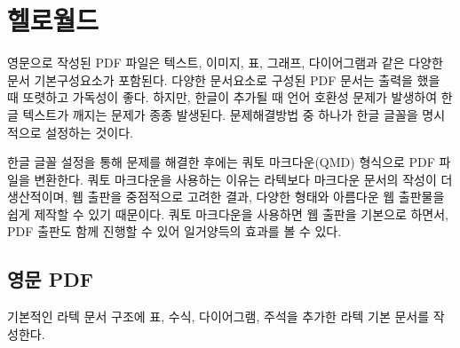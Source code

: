 \documentclass[
  letterpaper,
]{book}
\begin{document}
\hypertarget{uxd5ecuxb85cuxc6d4uxb4dc}{%
\section{헬로월드}\label{uxd5ecuxb85cuxc6d4uxb4dc}}

영문으로 작성된 PDF 파일은 텍스트, 이미지, 표, 그래프, 다이어그램과 같은
다양한 문서 기본구성요소가 포함된다. 다양한 문서요소로 구성된 PDF 문서는
출력을 했을 때 또렷하고 가독성이 좋다. 하지만, 한글이 추가될 때 언어
호환성 문제가 발생하여 한글 텍스트가 깨지는 문제가 종종 발생된다.
문제해결방법 중 하나가 한글 글꼴을 명시적으로 설정하는 것이다.

한글 글꼴 설정을 통해 문제를 해결한 후에는 쿼토 마크다운(QMD) 형식으로
PDF 파일을 변환한다. 쿼토 마크다운을 사용하는 이유는 라텍보다 마크다운
문서의 작성이 더 생산적이며, 웹 출판을 중점적으로 고려한 결과, 다양한
형태와 아름다운 웹 출판물을 쉽게 제작할 수 있기 때문이다. 쿼토
마크다운을 사용하면 웹 출판을 기본으로 하면서, PDF 출판도 함께 진행할 수
있어 일거양득의 효과를 볼 수 있다.

\hypertarget{uxc601uxbb38-pdf}{%
\subsection{영문 PDF}\label{uxc601uxbb38-pdf}}

기본적인 라텍 문서 구조에 표, 수식, 다이어그램, 주석을 추가한 라텍 기본
문서를 작성한다.
\end{document}

